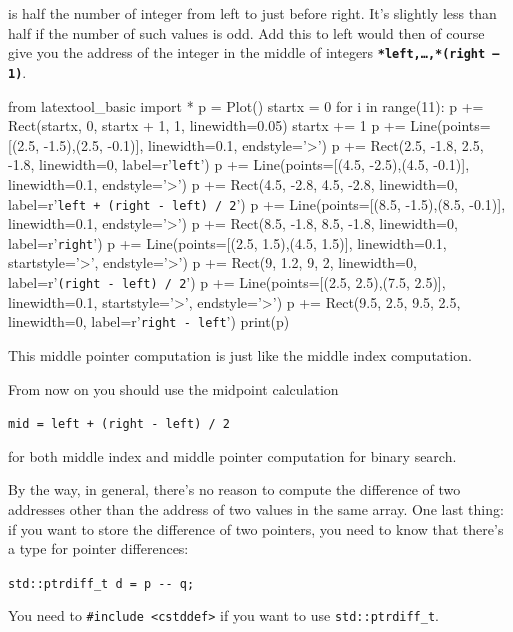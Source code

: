 is half the number of integer from left to just before right. It's slightly less than half if the number of such values is odd. Add this to left would then of course give you the address of the integer in the middle of integers \textbf{\texttt{*left,\ldots,*(right -- 1)}}.
\begin{python}
from latextool_basic import *
p = Plot()
startx = 0
for i in range(11):
    p += Rect(startx, 0, startx + 1, 1, linewidth=0.05)
    startx += 1
p += Line(points=[(2.5, -1.5),(2.5, -0.1)], linewidth=0.1, endstyle='>')
p += Rect(2.5, -1.8, 2.5, -1.8, linewidth=0, label=r'\texttt{left}')
p += Line(points=[(4.5, -2.5),(4.5, -0.1)], linewidth=0.1, endstyle='>')
p += Rect(4.5, -2.8, 4.5, -2.8, linewidth=0, label=r'\texttt{left + (right - left) / 2}')
p += Line(points=[(8.5, -1.5),(8.5, -0.1)], linewidth=0.1, endstyle='>')
p += Rect(8.5, -1.8, 8.5, -1.8, linewidth=0, label=r'\texttt{right}')
p += Line(points=[(2.5, 1.5),(4.5, 1.5)], linewidth=0.1, startstyle='>', endstyle='>')
p += Rect(9, 1.2, 9, 2, linewidth=0, label=r'\texttt{(right - left) / 2}')
p += Line(points=[(2.5, 2.5),(7.5, 2.5)], linewidth=0.1, startstyle='>', endstyle='>')
p += Rect(9.5, 2.5, 9.5, 2.5, linewidth=0, label=r'\texttt{right - left}')
print(p)
\end{python}
This middle pointer computation is just like the middle index computation.

From now on you should use the midpoint calculation

\verb!mid = left + (right - left) / 2!

for both middle index and middle pointer computation for binary search.

By the way, in general, there's no reason to compute the difference of
two addresses other than the address of two values in the same array.
One last thing: if you want to store the difference of two pointers, you
need to know that there's a type for pointer differences:

\verb!std::ptrdiff_t d = p -- q;!

You need to \verb!#include <cstddef>! if you want to use
\texttt{std::ptrdiff\_t}.



